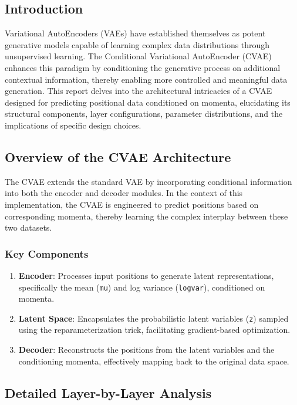 \documentclass[10pt]{article}
\begin{document}
\subsection{Introduction}

Variational AutoEncoders (VAEs) have established themselves as potent generative models capable of learning complex data distributions through unsupervised learning. The Conditional Variational AutoEncoder (CVAE) enhances this paradigm by conditioning the generative process on additional contextual information, thereby enabling more controlled and meaningful data generation. This report delves into the architectural intricacies of a CVAE designed for predicting positional data conditioned on momenta, elucidating its structural components, layer configurations, parameter distributions, and the implications of specific design choices.

\subsection{Overview of the CVAE Architecture}

The CVAE extends the standard VAE by incorporating conditional information into both the encoder and decoder modules. In the context of this implementation, the CVAE is engineered to predict positions based on corresponding momenta, thereby learning the complex interplay between these two datasets.

\subsubsection{Key Components}

\begin{enumerate}
    \item \textbf{Encoder}: Processes input positions to generate latent representations, specifically the mean (\texttt{mu}) and log variance (\texttt{logvar}), conditioned on momenta.
    \item \textbf{Latent Space}: Encapsulates the probabilistic latent variables (\texttt{z}) sampled using the reparameterization trick, facilitating gradient-based optimization.
    \item \textbf{Decoder}: Reconstructs the positions from the latent variables and the conditioning momenta, effectively mapping back to the original data space.
\end{enumerate}

\subsection{Detailed Layer-by-Layer Analysis}
\end{document}
